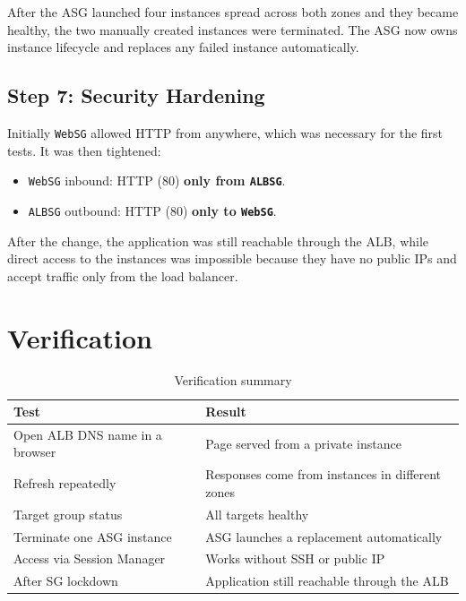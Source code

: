 \documentclass[11pt,a4paper]{article}
\begin{document}
After the ASG launched four instances spread across both zones and they became healthy, the two manually created instances were terminated. The ASG now owns instance lifecycle and replaces any failed instance automatically.


\subsection{Step 7: Security Hardening}
Initially \texttt{WebSG} allowed HTTP from anywhere, which was necessary for the first tests. It was then tightened:
\begin{itemize}
  \item \texttt{WebSG} inbound: HTTP (80) \textbf{only from \texttt{ALBSG}}.
  \item \texttt{ALBSG} outbound: HTTP (80) \textbf{only to \texttt{WebSG}}.
\end{itemize}
After the change, the application was still reachable through the ALB, while direct access to the instances was impossible because they have no public IPs and accept traffic only from the load balancer.


\section{Verification}
\begin{table}[H]
\centering
\renewcommand{\arraystretch}{1.25}
\begin{tabularx}{\linewidth}{l X}
\toprule
\textbf{Test} & \textbf{Result} \\
\midrule
Open ALB DNS name in a browser & Page served from a private instance \\
Refresh repeatedly & Responses come from instances in different zones \\
Target group status & All targets healthy \\
Terminate one ASG instance & ASG launches a replacement automatically \\
Access via Session Manager & Works without SSH or public IP \\
After SG lockdown & Application still reachable through the ALB \\
\bottomrule
\end{tabularx}
\caption{Verification summary}
\end{table}


\end{document}
